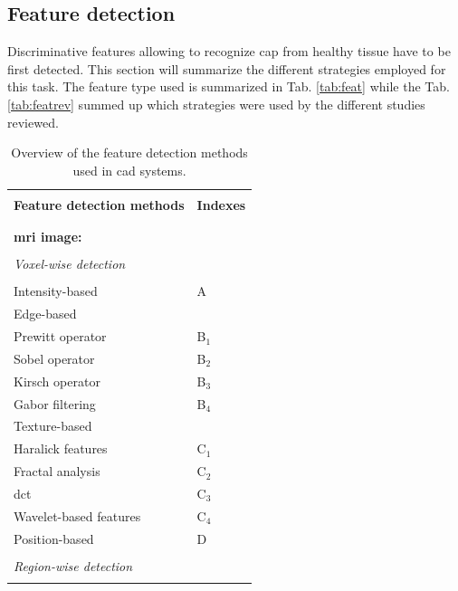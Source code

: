 \subsection{Feature detection} \label{subsec:featuredetection}

Discriminative features allowing to recognize \ac{cap} from healthy tissue have to be first detected. This section will summarize the different strategies employed for this task. The feature type used is summarized in Tab. \ref{tab:feat} while the Tab. \ref{tab:featrev} summed up which strategies were used by the different studies reviewed.

\begin{table}
	\caption{Overview of the feature detection methods used in \ac{cad} systems.}
	\small
	\renewcommand{\arraystretch}{.9}
	\begin{tabular}{p{.7\linewidth} >{\centering\arraybackslash}p{.20\linewidth}}
		\hline \\ [-1.5ex]
		\textbf{Feature detection methods} & \textbf{Indexes} \\ \\ [-1.5ex]
		\hline \\ [-1.5ex]
		\textbf{\ac{mri} image:} & \\ \\ [-1.5ex]
		\quad \textit{Voxel-wise detection} &  \\ \\ [-1.5ex]
		\quad \quad Intensity-based & A \\
		\quad \quad Edge-based & \\
		\quad \quad \quad Prewitt operator & B$_1$ \\
		\quad \quad \quad Sobel operator & B$_2$ \\
		\quad \quad \quad Kirsch operator & B$_3$ \\
		\quad \quad \quad Gabor filtering & B$_4$ \\ 
		\quad \quad Texture-based & \\
		\quad \quad \quad Haralick features & C$_1$ \\
		\quad \quad \quad Fractal analysis & C$_2$ \\
		\quad \quad \quad \Ac{dct} & C$_3$ \\
		\quad \quad \quad Wavelet-based features & C$_4$ \\
		\quad \quad Position-based & D \\ \\ [-1.5ex]
		\quad \textit{Region-wise detection} &  \\ \\ [-1.5ex]

\end{tabular}
\end{table}
